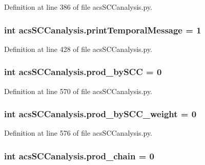 Definition at line 386 of file acs\-S\-C\-Canalysis.\-py.

\hypertarget{a00102_a3de1ee32e24403b152d565d8c52cf7fd}{
\subsubsection[{print\-Temporal\-Message}]{\setlength{\rightskip}{0pt plus 5cm}int acs\-S\-C\-Canalysis.\-print\-Temporal\-Message = 1}}\label{a00102_a3de1ee32e24403b152d565d8c52cf7fd}


Definition at line 428 of file acs\-S\-C\-Canalysis.\-py.

\hypertarget{a00102_abb2ac92624837ae48b882d145c5aab11}{
\subsubsection[{prod\-\_\-by\-S\-C\-C}]{\setlength{\rightskip}{0pt plus 5cm}int acs\-S\-C\-Canalysis.\-prod\-\_\-by\-S\-C\-C = 0}}\label{a00102_abb2ac92624837ae48b882d145c5aab11}


Definition at line 570 of file acs\-S\-C\-Canalysis.\-py.

\hypertarget{a00102_a5f45dbe461b3b18021c93780e87cc40e}{
\subsubsection[{prod\-\_\-by\-S\-C\-C\-\_\-weight}]{\setlength{\rightskip}{0pt plus 5cm}int acs\-S\-C\-Canalysis.\-prod\-\_\-by\-S\-C\-C\-\_\-weight = 0}}\label{a00102_a5f45dbe461b3b18021c93780e87cc40e}


Definition at line 576 of file acs\-S\-C\-Canalysis.\-py.

\hypertarget{a00102_ab307c6047e4d16ec0335266b24e7db5a}{
\subsubsection[{prod\-\_\-chain}]{\setlength{\rightskip}{0pt plus 5cm}int acs\-S\-C\-Canalysis.\-prod\-\_\-chain = 0}}\label{a00102_ab307c6047e4d16ec0335266b24e7db5a}


